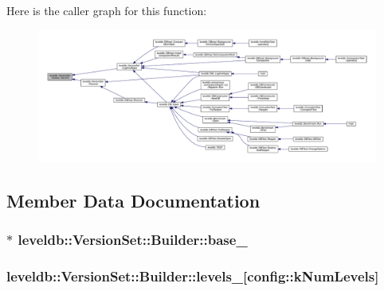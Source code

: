 Here is the caller graph for this function\+:
\nopagebreak
\begin{figure}[H]
\begin{center}
\leavevmode
\includegraphics[width=350pt]{classleveldb_1_1_version_set_1_1_builder_a429b23cc022cac08ab2ba880ac5803d1_icgraph}
\end{center}
\end{figure}




\subsection{Member Data Documentation}
\hypertarget{classleveldb_1_1_version_set_1_1_builder_a473a78b62dff568cb0304aa914c8a1d8}{}
\subsubsection[{base\+\_\+}]{$\ast$ leveldb\+::\+Version\+Set\+::\+Builder\+::base\+\_\+\hspace{0.3cm}{\ttfamily [private]}}\label{classleveldb_1_1_version_set_1_1_builder_a473a78b62dff568cb0304aa914c8a1d8}
\hypertarget{classleveldb_1_1_version_set_1_1_builder_ad11ed07449801fd19dd721b7b710d067}{}
\subsubsection[{levels\+\_\+}]{ leveldb\+::\+Version\+Set\+::\+Builder\+::levels\+\_\+\mbox{[}{\bf config\+::k\+Num\+Levels}\mbox{]}\hspace{0.3cm}{\ttfamily [private]}}\label{classleveldb_1_1_version_set_1_1_builder_ad11ed07449801fd19dd721b7b710d067}
\hypertarget{classleveldb_1_1_version_set_1_1_builder_a96967ae813b41ac070e8a9ea3df0dd7c}{}
